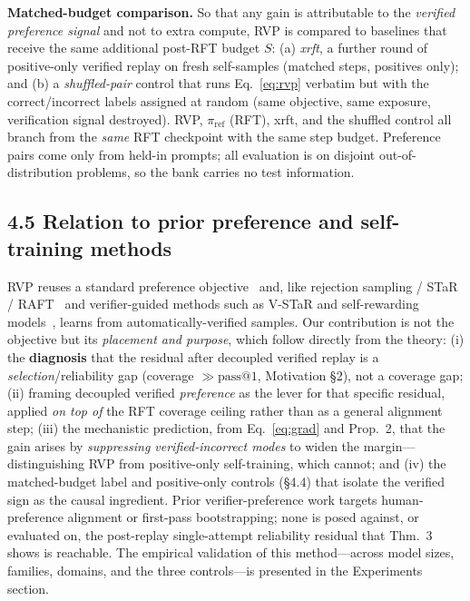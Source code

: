 \noindent\textbf{Matched-budget comparison.} So that any gain is attributable to
the \emph{verified preference signal} and not to extra compute, RVP is compared to
baselines that receive the same additional post-RFT budget $S$: (a) \emph{xrft}, a
further round of positive-only verified replay on fresh self-samples (matched
steps, positives only); and (b) a \emph{shuffled-pair} control that runs
Eq.~\eqref{eq:rvp} verbatim but with the correct/incorrect labels assigned at
random (same objective, same exposure, verification signal destroyed). RVP,
$\pi_{\text{ref}}$ (RFT), xrft, and the shuffled control all branch from the
\emph{same} RFT checkpoint with the same step budget. Preference pairs come only
from held-in prompts; all evaluation is on disjoint out-of-distribution problems,
so the bank carries no test information.

\subsection*{4.5 Relation to prior preference and self-training methods}

RVP reuses a standard preference objective~\cite{rafailov2023dpo} and, like
rejection sampling / STaR / RAFT~\cite{zelikman2022star,dong2023raft} and
verifier-guided methods such as V-STaR and self-rewarding
models~\cite{hosseini2024vstar,yuan2024selfreward}, learns from
automatically-verified samples. Our contribution is not the objective but its
\emph{placement and purpose}, which follow directly from the theory:
(i) the \textbf{diagnosis} that the residual after decoupled verified replay is a
\emph{selection}/reliability gap (coverage $\gg\text{pass}@1$, Motivation \S2), not
a coverage gap; (ii) framing decoupled verified \emph{preference} as the lever for
that specific residual, applied \emph{on top of} the RFT coverage ceiling rather
than as a general alignment step; (iii) the mechanistic prediction, from
Eq.~\eqref{eq:grad} and Prop.~2, that the gain arises by \emph{suppressing
verified-incorrect modes} to widen the margin---distinguishing RVP from
positive-only self-training, which cannot; and (iv) the matched-budget label and
positive-only controls (\S4.4) that isolate the verified sign as the causal
ingredient. Prior verifier-preference work targets human-preference alignment or
first-pass bootstrapping; none is posed against, or evaluated on, the post-replay
single-attempt reliability residual that Thm.~3 shows is reachable. The empirical
validation of this method---across model sizes, families, domains, and the three
controls---is presented in the Experiments section.
